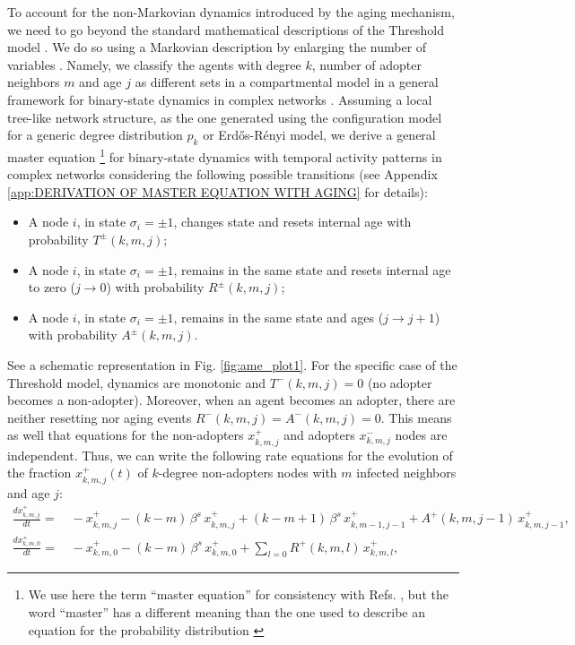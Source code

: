 To account for the non-Markovian dynamics introduced by the aging mechanism, we need to go beyond the standard mathematical descriptions of the Threshold model \cite{gleeson-2007,gleeson-2008,gleeson-2013}. We do so using a Markovian description by enlarging the number of variables \cite{peralta-2020C,peralta-2020A}. Namely, we classify the agents with degree $k$, number of adopter neighbors $m$ and age $j$ as different sets in a compartmental model in a general framework for binary-state dynamics in complex networks \cite{watts-2002, gleeson-2011,gleeson-2013}. Assuming a local tree-like network structure, as the one generated using the configuration model for a generic degree distribution $p_k$ \cite{molloy-1995,newman-2001} or Erd\H{o}s-R\'enyi model, we derive a general master equation \footnote{We use here the term  ``master equation'' for consistency with  Refs. \cite{gleeson-2011,gleeson-2013}, but the word ``master'' has a different meaning than the one used to describe an equation for the probability distribution \cite{peralta-2020B}} for binary-state dynamics with temporal activity patterns in complex networks considering the following possible transitions (see Appendix \ref{app:DERIVATION OF MASTER EQUATION WITH AGING} for details):
\begin{itemize}
    \item A node $i$, in state $\sigma_i = \pm 1$, changes state and resets internal age with probability $T^{\pm} (k,m,j)$;
    \item A node $i$, in state $\sigma_i = \pm 1$, remains in the same state and resets internal age to zero ($j \to 0$) with probability $R^{\pm} (k,m,j)$;
    \item A node $i$, in state $\sigma_i = \pm 1$, remains in the same state and ages ($j \to j+1$) with probability $A^{\pm} (k,m,j)$.
\end{itemize}
See a schematic representation in Fig. \ref{fig:ame_plot1}. For the specific case of the Threshold model, dynamics are monotonic and $T^{-} (k,m,j) = 0$ (no adopter becomes a non-adopter). Moreover, when an agent becomes an adopter, there are neither resetting nor aging events $R^{-} (k,m,j) = A^{-} (k,m,j) = 0$. This means as well that equations for the non-adopters $x^{+}_{k,m,j}$ and adopters $x^{-}_{k,m,j}$ nodes are independent. Thus, we can write the following rate equations for the evolution of the fraction $x^{+}_{k,m,j} (t)$ of $k$-degree non-adopters nodes with $m$ infected neighbors and age $j$:
\begin{align}
\label{eq:AME_Threshold}
\frac{d x^{+}_{k,m,j}}{dt} = & \,  - x^{+}_{k,m,j} - (k-m)\, \beta^s \, x^{+}_{k,m,j} + (k-m+1) \, \beta^s \, x^{+}_{k,m-1,j-1} + A^{+} (k,m,j-1)\, x^{+}_{k,m,j-1},  \\
\frac{d x^{+}_{k,m,0}}{dt}  = & \,   - x^{+}_{k,m,0} - (k - m)\, \beta^s   \,x^{+}_{k,m,0} + \sum_{l = 0} R^{+} (k,m,l)\, x^{+}_{k,m,l}, \nonumber 
\end{align}
